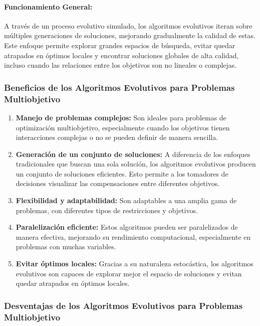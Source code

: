 \documentclass[12pt]{article}
\begin{document}
\paragraph{Funcionamiento General:}
A través de un proceso evolutivo simulado, los algoritmos evolutivos iteran sobre múltiples generaciones de soluciones, mejorando gradualmente la calidad de estas. Este enfoque permite explorar grandes espacios de búsqueda, evitar quedar atrapados en óptimos locales y encontrar soluciones globales de alta calidad, incluso cuando las relaciones entre los objetivos son no lineales o complejas.

\subsubsection{Beneficios de los Algoritmos Evolutivos para Problemas Multiobjetivo}

\begin{enumerate}
	\item \textbf{Manejo de problemas complejos:} Son ideales para problemas de optimización multiobjetivo, especialmente cuando los objetivos tienen interacciones complejas o no se pueden definir de manera sencilla.
	\item \textbf{Generación de un conjunto de soluciones:} A diferencia de los enfoques tradicionales que buscan una sola solución, los algoritmos evolutivos producen un conjunto de soluciones eficientes. Esto permite a los tomadores de decisiones visualizar las compensaciones entre diferentes objetivos.
	\item \textbf{Flexibilidad y adaptabilidad:} Son adaptables a una amplia gama de problemas, con diferentes tipos de restricciones y objetivos.
	\item \textbf{Paralelización eficiente:} Estos algoritmos pueden ser paralelizados de manera efectiva, mejorando su rendimiento computacional, especialmente en problemas con muchas variables.
	\item \textbf{Evitar óptimos locales:} Gracias a su naturaleza estocástica, los algoritmos evolutivos son capaces de explorar mejor el espacio de soluciones y evitan quedar atrapados en óptimos locales.
\end{enumerate}

\subsubsection{Desventajas de los Algoritmos Evolutivos para Problemas Multiobjetivo}
\end{document}

